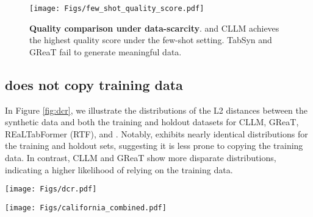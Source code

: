 \begin{figure}[h]
  \centering
  \texttt{[image: Figs/few\_shot\_quality\_score.pdf]}
  \caption{\textbf{Quality comparison under data-scarcity}. \modelname and CLLM achieves the highest quality score under the few-shot setting. TabSyn and GReaT fail to generate meaningful data.}
  \label{fig:low-resource}
\end{figure}

\subsection{\modelname does not copy training data}
In Figure \ref{fig:dcr}, we illustrate the distributions of the L2 distances between the synthetic data and both the training and holdout datasets for CLLM, GReaT, REaLTabFormer (RTF), and \modelname. Notably, \modelname exhibits nearly identical distributions for the training and holdout sets, suggesting it is less prone to copying the training data. In contrast, CLLM and GReaT show more disparate distributions, indicating a higher likelihood of relying on the training data.


\vspace{-2em}
\begin{figure*}[t!]
  \centering
  \texttt{[image: Figs/dcr.pdf]}
  \caption{\textbf{Privacy comparison}: Distributions of the DCR scores between the synthetic dataset and the training/holdout datasets. \modelname and Curated-LLM (CLLM) are both employed with GPT-4o-mini. \label{fig:dcr}}
\end{figure*}

\begin{figure*}[h!]
  \centering
  \vspace{-10pt}
  \texttt{[image: Figs/california\_combined.pdf]}
  \caption{\textbf{Visual comparison}: 2D scatter plot of \texttt{Longitude} and \texttt{Latitude} attributes of California dataset. Real represents the original training datasets. All sets are downsampled to 3000 rows for better visualization.  \modelname generates spatially coherent synthetic data that closely matches the distribution of the original dataset.}
  \label{fig:2d-california}
  \vspace{-10pt}
\end{figure*}

